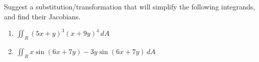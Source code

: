     Suggest a substitution/transformation that will simplify the following integrands, and find their Jacobians.
    \begin{enumerate}
        \item $\iint_R (5x + y)^3 (x + 9y)^4 \, dA$
        \item $\iint_R x \sin(6x + 7y) - 3y \sin(6x + 7y) \, dA$
    \end{enumerate}
